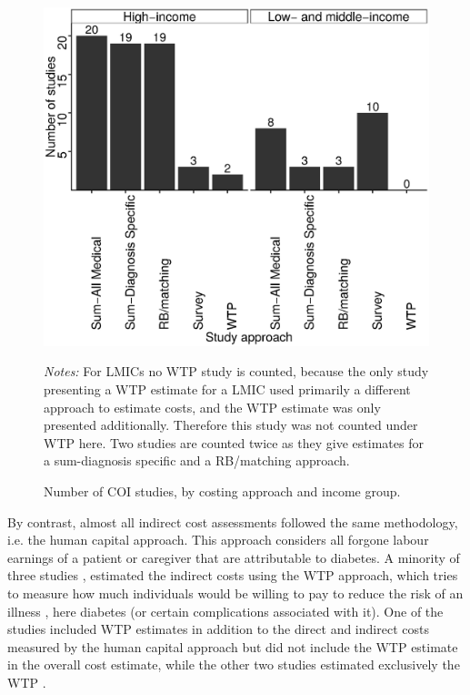 \documentclass[12pt,english]{article}
\begin{document}
\begin{figure}[hp]
\caption{\label{fig:review_COI_number}Number of \ac{COI} studies, by costing approach and income group.}%

\begin{minipage}{\linewidth}
\begin{center}
\includegraphics[width=0.5\linewidth]{Review/Figures/Fig2.eps}\\
\end{center}
\footnotesize
\emph{Notes:} For \acp{LMIC} no \ac{WTP} study is counted, because the only study \parencite{Tharkar2010a} presenting a \ac{WTP} estimate for a \ac{LMIC} used primarily a different approach to estimate costs, and the \ac{WTP} estimate was only presented additionally. Therefore this study was not counted under \ac{WTP} here. Two studies are counted twice as they give estimates for a sum-diagnosis specific and a RB/matching approach.
\end{minipage}
\end{figure}

By contrast, almost all indirect cost assessments followed the same methodology, i.e. the human capital approach. This approach considers all forgone labour earnings of a patient or caregiver that are attributable to diabetes. A minority of three studies \parencite{Tharkar2010a,Chang2010b,Gyldmark2001}, estimated the indirect costs using the \ac{WTP} approach, which tries to measure how much individuals would be willing to pay to reduce the risk of an illness \parencite{Segel2006}, here diabetes (or certain complications associated with it). One of the studies included \ac{WTP} estimates in addition to the direct and indirect costs measured by the human capital approach \parencite{Tharkar2010a} but did not include the \ac{WTP} estimate in the overall cost estimate, while the other two studies estimated exclusively the \ac{WTP} \parencite{Chang2010b,Gyldmark2001}.

\FloatBarrier
\end{document}
